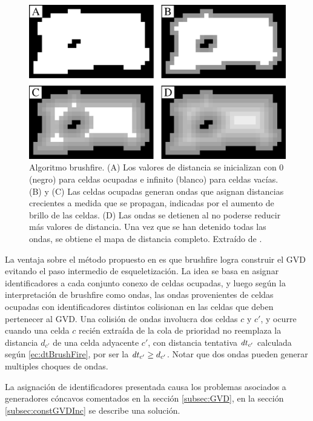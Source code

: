 \begin{figure}[H]
  \center
  \includegraphics[width=1\linewidth]{imagenes/wavesBrush2Rows.png}
  \caption[Algoritmo brushfire.]{Algoritmo brushfire. (A) Los valores de distancia se inicializan con 0 (negro) para celdas ocupadas e infinito (blanco) para celdas vacías. (B) y (C) Las celdas ocupadas generan ondas que asignan distancias crecientes a medida que se propagan, indicadas por el aumento de brillo de las celdas. (D) Las ondas se detienen al no poderse reducir más valores de distancia. Una vez que se han detenido todas las ondas, se obtiene el mapa de distancia completo. Extraído de \cite{Lau2013}.}\label{fig:wavesBrush}
\end{figure} 

La ventaja sobre el método propuesto en \cite{wurm2008coordinated} es
que brushfire logra construir el GVD evitando el paso intermedio de
esqueletización. La idea se basa en asignar identificadores a cada
conjunto conexo de celdas ocupadas, y luego según la interpretación de
brushfire como ondas, las ondas provenientes de celdas ocupadas con
identificadores distintos colisionan en las celdas que deben pertenecer
al GVD. Una colisión de ondas involucra dos celdas $c$ y $c'$, y ocurre cuando
una celda $c$ recién extraída de la cola de prioridad no reemplaza la distancia
$d_{c'}$ de una celda adyacente $c'$, con distancia tentativa $\mathit{dt}_{c'}$
calculada según \ref{ec:dtBrushFire}, por ser la  $\mathit{dt}_{c'}\geq d_{c'}$.
Notar que dos ondas pueden generar multiples choques de ondas.  

La asignación de identificadores presentada causa los problemas asociados a
generadores cóncavos comentados en la sección \ref{subsec:GVD}, en la sección
\ref{subsec:constGVDInc} se describe una solución. 

